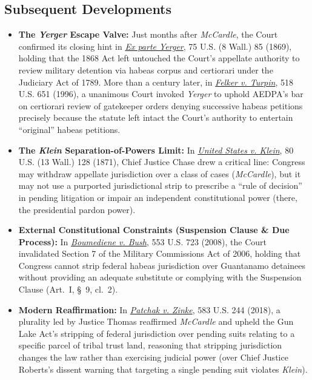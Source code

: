 \documentclass[12pt]{article}
\begin{document}
\subsection{Subsequent Developments}

\begin{itemize}
  \item \textbf{The \textit{Yerger} Escape Valve:} Just months after \textit{McCardle}, the Court confirmed its closing hint in \href{https://supreme.justia.com/cases/federal/us/75/85/}{\textit{Ex parte Yerger}}, 75 U.S. (8 Wall.) 85 (1869), holding that the 1868 Act left untouched the Court's appellate authority to review military detention via habeas corpus and certiorari under the Judiciary Act of 1789. More than a century later, in \href{https://supreme.justia.com/cases/federal/us/518/651/}{\textit{Felker v. Turpin}}, 518 U.S. 651 (1996), a unanimous Court invoked \textit{Yerger} to uphold AEDPA's bar on certiorari review of gatekeeper orders denying successive habeas petitions precisely because the statute left intact the Court's authority to entertain ``original'' habeas petitions.
  \item \textbf{The \textit{Klein} Separation-of-Powers Limit:} In \href{https://supreme.justia.com/cases/federal/us/80/128/}{\textit{United States v. Klein}}, 80 U.S. (13 Wall.) 128 (1871), Chief Justice Chase drew a critical line: Congress may withdraw appellate jurisdiction over a class of cases (\textit{McCardle}), but it may not use a purported jurisdictional strip to prescribe a ``rule of decision'' in pending litigation or impair an independent constitutional power (there, the presidential pardon power).
  \item \textbf{External Constitutional Constraints (Suspension Clause \& Due Process):} In \href{https://supreme.justia.com/cases/federal/us/553/723/}{\textit{Boumediene v. Bush}}, 553 U.S. 723 (2008), the Court invalidated Section 7 of the Military Commissions Act of 2006, holding that Congress cannot strip federal habeas jurisdiction over Guantanamo detainees without providing an adequate substitute or complying with the Suspension Clause (Art.\ I, \S~9, cl.~2).

\item \textbf{Modern Reaffirmation:} In \href{https://supreme.justia.com/cases/federal/us/583/16-498/}{\textit{Patchak v. Zinke}}, 583 U.S. 244 (2018), a plurality led by Justice Thomas reaffirmed \textit{McCardle} and upheld the Gun Lake Act's stripping of federal jurisdiction over pending suits relating to a specific parcel of tribal trust land, reasoning that stripping jurisdiction changes the law rather than exercising judicial power (over Chief Justice Roberts's dissent warning that targeting a single pending suit violates \textit{Klein}).

\end{itemize}
\end{document}
